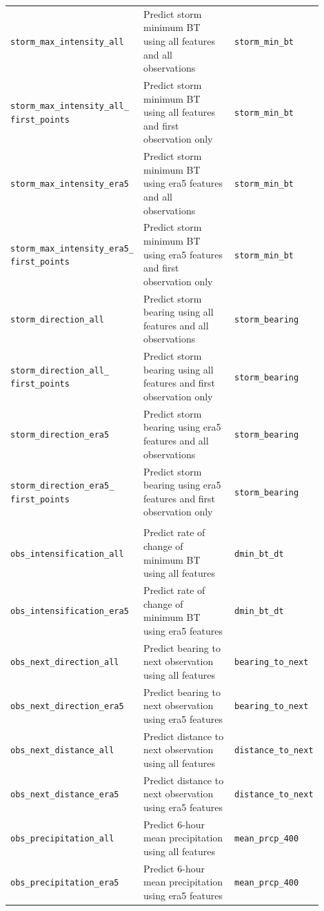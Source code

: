 {\begin{longtable}{>{\raggedright\arraybackslash}p{0.27\linewidth} p{0.43\linewidth} >{\raggedright\arraybackslash}p{0.20\linewidth}}
    \multicolumn{3}{c}{\textit{Storm Aggregate Prediction Tasks}} \\
    \midrule
    \texttt{storm\_max\_intensity\_all} & Predict storm minimum BT using all features and all observations & \texttt{storm\_min\_bt} \\
    \texttt{storm\_max\_intensity\_all\_ first\_points} & Predict storm minimum BT using all features and first observation only & \texttt{storm\_min\_bt} \\
    \texttt{storm\_max\_intensity\_era5} & Predict storm minimum BT using \acrshort{era5} features and all observations & \texttt{storm\_min\_bt} \\
    \texttt{storm\_max\_intensity\_era5\_ first\_points} & Predict storm minimum BT using \acrshort{era5} features and first observation only & \texttt{storm\_min\_bt} \\
    \texttt{storm\_direction\_all} & Predict storm bearing using all features and all observations & \texttt{storm\_bearing} \\
    \texttt{storm\_direction\_all\_ first\_points} & Predict storm bearing using all features and first observation only & \texttt{storm\_bearing} \\
    \texttt{storm\_direction\_era5} & Predict storm bearing using \acrshort{era5} features and all observations & \texttt{storm\_bearing} \\
    \texttt{storm\_direction\_era5\_ first\_points} & Predict storm bearing using \acrshort{era5} features and first observation only & \texttt{storm\_bearing} \\
    \midrule
    \multicolumn{3}{c}{\textit{Immediate Characteristic Prediction Tasks}} \\
    \midrule
    \texttt{obs\_intensification\_all} & Predict rate of change of minimum BT using all features & \texttt{dmin\_bt\_dt} \\
    \texttt{obs\_intensification\_era5} & Predict rate of change of minimum BT using \acrshort{era5} features & \texttt{dmin\_bt\_dt} \\
    \texttt{obs\_next\_direction\_all} & Predict bearing to next observation using all features & \texttt{bearing\_to\_next} \\
    \texttt{obs\_next\_direction\_era5} & Predict bearing to next observation using \acrshort{era5} features & \texttt{bearing\_to\_next} \\
    \texttt{obs\_next\_distance\_all} & Predict distance to next observation using all features & \texttt{distance\_to\_next} \\
    \texttt{obs\_next\_distance\_era5} & Predict distance to next observation using \acrshort{era5} features & \texttt{distance\_to\_next} \\
    \texttt{obs\_precipitation\_all} & Predict 6-hour mean precipitation using all features & \texttt{mean\_prcp\_400} \\
    \texttt{obs\_precipitation\_era5} & Predict 6-hour mean precipitation using \acrshort{era5} features & \texttt{mean\_prcp\_400} \\
\end{longtable}
}